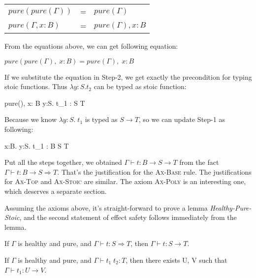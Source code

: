 \begin{center}
\begin{tabular}{l c l}
$pure(pure(\Gamma))$ & = & $pure(\Gamma)$ \\
$pure(\Gamma, x:B)$ & = & $pure(\Gamma), x:B$
\end{tabular}
\end{center}

From the equations above, we can get following equation:

\begin{center}
  $pure(pure(\Gamma),\; x: B) = pure(\Gamma),\; x: B$
\end{center}

If we substitute the equation in Step-2, we get exactly the
precondition for typing stoic functions. Thus $\lambda y:S.t_2$ can be
typed as stoic function:

{ pure(\Gamma),\; x: B \vdash \lambda y:S. \; t_1 : S \to T }

Because we know $\lambda y:S. \; t_1$ is typed as $S \to T$, so we can
update Step-1 as following:

{ \Gamma \vdash \lambda x:B. \lambda y:S. \; t_1 : B \to S \to T }

Put all the steps together, we obtained
$\Gamma \vdash t : B \to S \to T$ from the fact
$\Gamma \vdash t : B \to S \Rightarrow T$. That's the justification
for the \textsc{Ax-Base} rule. The justifications for \textsc{Ax-Top}
and \textsc{Ax-Stoic} are similar. The axiom \textsc{Ax-Poly} is an
interesting one, which deserves a separate section.

Assuming the axioms above, it's straight-forward to prove a lemma
\emph{Healthy-Pure-Stoic}, and the second statement of effect safety
follows immediately from the lemma.

\begin{lemma}
  If $\Gamma$ is healthy and pure,  and $\Gamma \vdash t : S
  \Rightarrow T$, then $\Gamma \vdash t : S \to T$.
\end{lemma}

\begin{theorem}
  If $\Gamma$ is healthy and pure, and $\Gamma \vdash t_1 \; t_2 :
  T$, then there exists U, V such that $\Gamma \vdash t_1 : U \to V$.
\end{theorem}


